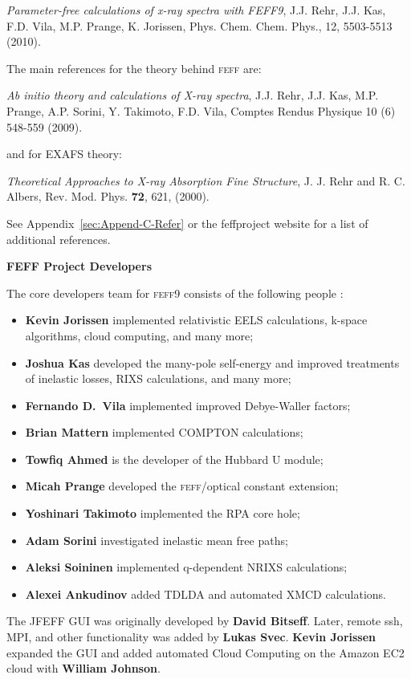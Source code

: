 \documentclass[11pt,oneside]{report} %
\newcommand{\program}[1]{\textsc{#1}}
\newcommand{\feff}{\program{feff}}
\newcommand{\vnum}{9}
\newcommand{\feffcur}{\feff\vnum}
\begin{document}
\begin{latexonly}
\emph{Parameter-free calculations of x-ray spectra with FEFF9},
J.J. Rehr, J.J. Kas, F.D. Vila, M.P. Prange, K. Jorissen,
Phys. Chem. Chem. Phys., 12, 5503-5513 (2010).


The main references for the theory behind {\feff} are:

\emph{Ab initio theory and calculations of X-ray spectra},
 J.J. Rehr, J.J. Kas, M.P. Prange, A.P. Sorini, Y. Takimoto, F.D. Vila, Comptes Rendus Physique 10 (6) 548-559 (2009).
 
and for EXAFS theory:

\emph{Theoretical Approaches to X-ray Absorption Fine Structure},
J. J. Rehr and R. C. Albers, Rev. Mod. Phys. {\bf72}, 621, (2000).
 
See Appendix~\ref{sec:Append-C-Refer}  or the feffproject website for a list of additional references.

 
 

\medskip

{\bf FEFF Project Developers}

 The core developers team for {\feffcur} consists of the following people :
\begin{itemize}
\label{developers} 
\item {\bf Kevin Jorissen} implemented relativistic EELS calculations, k-space algorithms, cloud computing, and many more;
\item {\bf Joshua Kas} developed the many-pole self-energy and improved treatments of inelastic losses, RIXS calculations, and many more;
\item {\bf Fernando D.\ Vila} implemented improved Debye-Waller factors;
\item {\bf Brian Mattern} implemented COMPTON calculations;
\item {\bf Towfiq Ahmed} is the developer of the Hubbard U module;
\item {\bf Micah Prange} developed the {\feff}/optical constant extension; 
\item {\bf Yoshinari Takimoto} implemented the RPA core hole;
\item {\bf Adam Sorini} investigated inelastic mean free paths;
\item {\bf Aleksi Soininen} implemented q-dependent NRIXS calculations;
\item {\bf Alexei Ankudinov} added TDLDA and automated XMCD calculations.
\end{itemize}

The JFEFF GUI was originally developed by {\bf David Bitseff}. 
Later, remote ssh, MPI, and other functionality was added by
{\bf Lukas Svec}. {\bf Kevin Jorissen} expanded the GUI and added automated Cloud Computing on the Amazon EC2 cloud with {\bf William Johnson}.


\end{latexonly}
\end{document}
